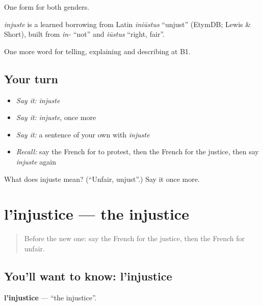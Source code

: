 One form for both genders.

\begin{cousinweb}
\emph{injuste} is a learned borrowing from Latin \emph{iniūstus} \textquotedblleft{}unjust\textquotedblright{} (EtymDB; Lewis \& Short), built from \emph{in-} \textquotedblleft{}not\textquotedblright{} and \emph{iūstus} \textquotedblleft{}right, fair\textquotedblright{}.
\end{cousinweb}

\begin{grammarlens}[title={What you've built}]
One more word for telling, explaining and describing at B1.
\end{grammarlens}

\subsection*{Your turn}
\begin{itemize}
\raggedright
  \item \emph{Say it:} \emph{injuste}
  \item \emph{Say it:} \emph{injuste}, once more
  \item \emph{Say it:} a sentence of your own with \emph{injuste}
  \item \emph{Recall:} say the French for to protest, then the French for the justice, then say \emph{injuste} again
\end{itemize}

\begin{tcolorbox}[breakable,colback=teal!4,colframe=teal!35!black,title={Before you move on}]
What does injuste mean? (\textquotedblleft{}Unfair, unjust\textquotedblright{}.) Say it once more.
\end{tcolorbox}
\section[l'injustice]{l'injustice — the injustice}

\label{lesson:FR-C364-injustice}



\begin{quote}
Before the new one: say the French for the justice, then the French for unfair.
\end{quote}

\subsection*{You'll want to know: l'injustice}
\textbf{l'injustice} — \textquotedblleft{}the injustice\textquotedblright{}.

